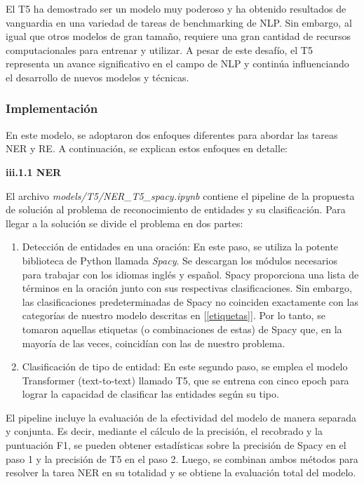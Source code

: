 \documentclass[10pt]{article} %
\begin{document}
	El T5 ha demostrado ser un modelo muy poderoso y ha obtenido resultados de vanguardia en una variedad de tareas de benchmarking de NLP. Sin embargo, al igual que otros modelos de gran tamaño, requiere una gran cantidad de recursos computacionales para entrenar y utilizar. A pesar de este desafío, el T5 representa un avance significativo en el campo de NLP y continúa influenciando el desarrollo de nuevos modelos y técnicas.
	
	\subsubsection{Implementaci\'on}
	
	En este modelo, se adoptaron dos enfoques diferentes para abordar las tareas NER y RE. A continuación, se explican estos enfoques en detalle:
	
	\vspace{0.5em}
	\textbf{iii.1.1 NER}
	\vspace{0.5em}
	
	
	
	El archivo \textit{models/T5/NER\_T5\_spacy.ipynb} contiene el pipeline de la propuesta de soluci\'on al problema de reconocimiento de entidades y su clasificaci\'on. Para llegar a la soluci\'on se divide el problema en dos partes:
	\begin{enumerate}
		\item Detección de entidades en una oración: En este paso, se utiliza la potente biblioteca de Python llamada \textit{Spacy}. Se descargan los módulos necesarios para trabajar con los idiomas inglés y español. Spacy proporciona una lista de términos en la oración junto con sus respectivas clasificaciones. Sin embargo, las clasificaciones predeterminadas de Spacy no coinciden exactamente con las categorías de nuestro modelo descritas en [\ref{etiquetas}]. Por lo tanto, se tomaron aquellas etiquetas (o combinaciones de estas) de Spacy que, en la mayoría de las veces, coincidían con las de nuestro problema.
		\item Clasificación de tipo de entidad: En este segundo paso, se emplea el modelo Transformer (text-to-text) llamado T5, que se entrena con cinco epoch para lograr la capacidad de clasificar las entidades según su tipo.
	\end{enumerate}
		
	El pipeline incluye la evaluación de la efectividad del modelo de manera separada y conjunta. Es decir, mediante el cálculo de la precisión, el recobrado y la puntuación F1, se pueden obtener estadísticas sobre la precisión de Spacy en el paso 1 y la precisión de T5 en el paso 2. Luego, se combinan ambos métodos para resolver la tarea NER en su totalidad y se obtiene la evaluaci\'on total del modelo.
	
\end{document}
